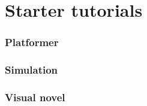 \documentclass{beamer}
\begin{document}
\section{Starter tutorials}
\begin{frame}
\frametitle{Platformer}
\begin{figure}
\end{figure}
\end{frame}

\begin{frame}
\frametitle{Simulation}
\begin{figure}
\end{figure}
\end{frame}

\begin{frame}
\frametitle{Visual novel}
\begin{figure}
\end{figure}
\end{frame}
\end{document}

